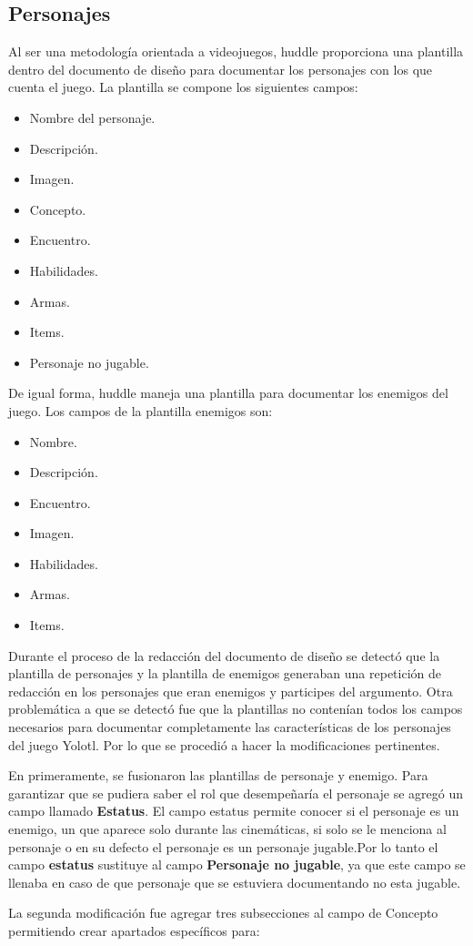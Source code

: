 \subsection{Personajes}
Al ser una metodología orientada a videojuegos, huddle proporciona una plantilla dentro del documento de diseño para documentar los personajes con los que cuenta el juego. La plantilla se compone los siguientes campos:
	\begin{itemize}
		\item Nombre del personaje.
		\item Descripción. 
		\item Imagen.
		\item Concepto. 
		\item Encuentro. 
		\item Habilidades. 
		\item Armas.
		\item Items.  
		\item Personaje no jugable. 
	\end{itemize}
	De igual forma, huddle maneja una plantilla para documentar los enemigos del juego. Los campos de la plantilla enemigos son:
	\begin{itemize}
		\item Nombre.
		\item Descripción.
		\item Encuentro.
		\item Imagen.
		\item Habilidades.
		\item Armas.
		\item Items.
	\end{itemize}
	Durante el proceso de la redacción del documento de diseño se detectó que la plantilla de personajes y la plantilla de enemigos generaban una repetición de redacción en los personajes que eran enemigos y participes del argumento. Otra problemática a que se detectó fue que la plantillas no contenían todos los campos necesarios para documentar completamente las características de los personajes del juego Yolotl. Por lo que se procedió a hacer la modificaciones pertinentes.
\\
\par	
	En primeramente, se fusionaron las plantillas de personaje y enemigo. Para garantizar que se pudiera saber el rol que desempeñaría el personaje se agregó un campo llamado \textbf{Estatus}.  El campo estatus permite conocer si el personaje es un enemigo, un que aparece solo durante las cinemáticas, si solo se le menciona al personaje o en su defecto el personaje es un personaje jugable.Por lo tanto el campo \textbf{estatus} sustituye al campo \textbf{Personaje no jugable}, ya que este campo se llenaba en caso de que personaje que se estuviera documentando no esta jugable.
	\\
	\par
La segunda modificación fue agregar tres subsecciones al campo de Concepto permitiendo  crear apartados específicos para:

